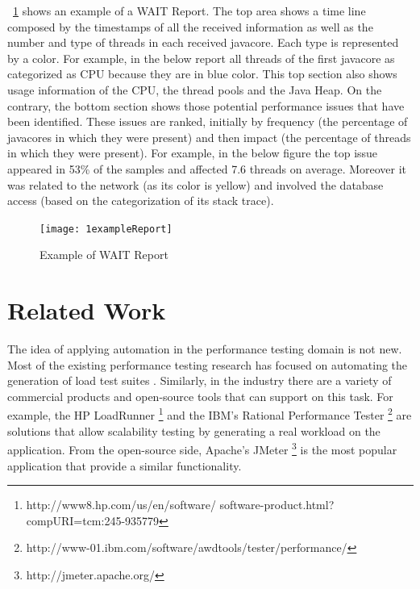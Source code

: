 \documentclass[runningheads,a4paper]{llncs}
\begin{document}
\figurename ~\ref{fig_WAITReport} shows an example of a WAIT Report. The top
area shows a time line composed by the timestamps of all the received
information as well as the number and type of threads in each received javacore.
Each type is represented by a color. For example, in the below report all
threads of the first javacore as categorized as CPU because they are in blue
color. This top section also shows usage information of the CPU, the thread
pools and the Java Heap. On the contrary, the bottom section shows those potential
performance issues that have been identified. These issues are ranked, initially
by frequency (the percentage of javacores in which they were present) and then
impact (the percentage of threads in which they were present). For example, in
the below figure the top issue appeared in 53\% of the samples and affected 7.6 threads on average.
Moreover it was related to the network (as its color is yellow) and involved the
database access (based on the categorization of its stack trace).

\begin{figure}[!h]
\texttt{[image: 1exampleReport]}
\caption{Example of WAIT Report}
\label{fig_WAITReport}
\end{figure}


\section{Related Work}

The idea of applying automation in the performance testing domain is not new.
Most of the existing performance testing research has focused on automating the generation of 
load test suites \cite{Chen1,Elvira1,Zhang1,Briand1,Avritzer1,Bayan1,Avritzer2,Avritzer3,Garousi1}.
Similarly, in the industry there are a variety of commercial products and
open-source tools that can support on this task. For example, the HP LoadRunner
\footnote{http://www8.hp.com/us/en/software/ software-product.html?compURI=tcm:245-935779} and 
the IBM's Rational Performance Tester
\footnote{http://www-01.ibm.com/software/awdtools/tester/performance/} are solutions that 
allow scalability testing by generating a real workload on the application. From the
open-source side, Apache's JMeter \footnote{http://jmeter.apache.org/} is the
most popular application that provide a similar functionality.
\end{document}
